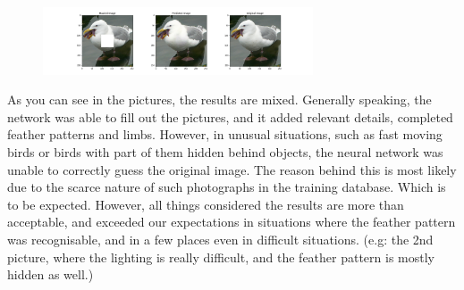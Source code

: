 \documentclass[conference]{IEEEtran}
\begin{document}
\begin{figure}[!htb]
  \centering
  \includegraphics[width=80mm, keepaspectratio]{figures/result_5.png}
\end{figure}

As you can see in the pictures, the results are mixed. Generally speaking, the network was able to fill out the pictures, and it added relevant details, completed feather patterns and limbs. However, in unusual situations, such as fast moving birds or birds with part of them hidden behind objects,  the neural network was unable to correctly guess the original image. 
The reason behind this is most likely due to the scarce nature of such photographs in the training database. Which is to be expected. 
However, all things considered the results are more than acceptable, and exceeded our expectations in situations where the feather pattern was recognisable, and in a few places even in difficult situations. (e.g: the 2nd picture, where the lighting is really difficult, and the feather pattern is mostly hidden as well.)
\end{document}
